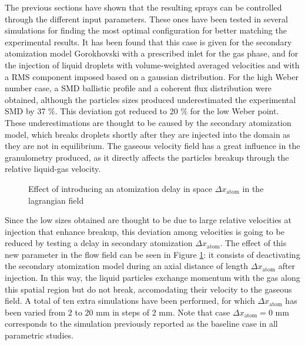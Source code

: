 The previous sections have shown that the resulting sprays can be controlled through the different input parameters. These ones have been tested in several simulations for finding the most optimal configuration for better matching the experimental results. It has been found that this case is given for the secondary atomization model Gorokhovski with a prescribed inlet for the gas phase, and for the injection of liquid droplets with volume-weighted averaged velocities and with a RMS component imposed based on a gaussian distribution. For the high Weber number case, a SMD ballistic profile and a coherent flux distribution were obtained, although the particles sizes produced underestimated the experimental SMD by 37 $\%$. This deviation got reduced to 20 $\%$ for the low Weber point. These underestimations are thought to be caused by the secondary atomization model, which breaks droplets shortly after they are injected into the domain as they are not in equilibrium. The gaseous velocity field has a great influence in the granulometry produced, as it directly affects the particles breakup through the relative liquid-gas velocity. 

\begin{figure}[ht]
	\centering	{}
	\caption{Effect of introducing an atomization delay in space $\Delta x_\mathrm{atom}$ in the lagrangian field}
	\label{fig:JICF_LGS_dx_atom}
\end{figure}

\clearpage


Since the low sizes obtained are thought to be due to large relative velocities at injection that enhance breakup, this deviation among velocities is going to be reduced by testing a delay in secondary atomization $\Delta x_\mathrm{atom}$. The effect of this new parameter in the flow field can be seen in Figure \ref{fig:JICF_LGS_dx_atom}: it consists of deactivating the secondary atomization model during an axial distance of length $\Delta x_\mathrm{atom}$ after injection. In this way, the liquid particles exchange momentum  with the gas along this spatial region but do not break, accomodating their velocity to the gaseous field. A total of ten extra simulations have been performed, for which $\Delta x_\mathrm{atom}$ has been varied from 2 to 20 mm in steps of 2 mm. Note that case $\Delta x_\mathrm{atom} = 0$ mm corresponds to the simulation previously reported as the baseline case in all parametric studies.

